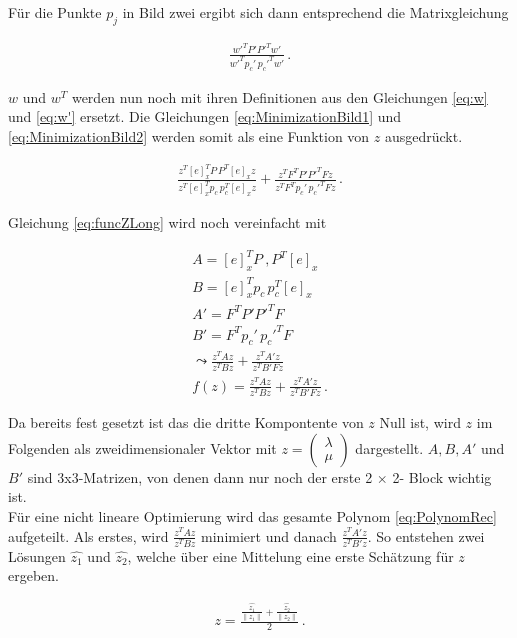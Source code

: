 Für die Punkte $p_j$ in Bild zwei ergibt sich dann entsprechend die Matrixgleichung

\begin{gather}
	\frac{w'^TP'P'^Tw'}{w'^Tp_c' \, p_c'^Tw'}\label{eq:MinimizationBild2}\, .
\end{gather} 


$w$ und $w^T$ werden nun noch mit ihren Definitionen aus den Gleichungen \ref{eq:w} und \ref{eq:w'} ersetzt. Die Gleichungen \ref{eq:MinimizationBild1} und \ref{eq:MinimizationBild2} werden somit als eine Funktion von $z$ ausgedrückt\cite{ZZ}. 

\begin{gather}
	\frac{z^T[e]_x^TP \, P^T[e]_xz}{z^T[e]_x^Tp_c \, p_c^T[e]_xz}+\frac{z^TF^TP'P'^TFz}{z^TF^Tp_c' \, p_c'^TFz} \, . \label{eq:funcZLong}
\end{gather}

Gleichung \ref{eq:funcZLong} wird noch vereinfacht mit

\begin{gather}
	A = [e]_x^TP \ ,P^T[e]_x\\
	B=[e]_x^Tp_c \, p_c^T[e]_x\\
	A'=F^TP'P'^TF\\
	B'= F^Tp_c' \, p_c'^TF\\
	\leadsto 
	\frac{z^TAz}{z^TBz}+\frac{z^TA'z}{z^TB'Fz}\\
	f(z) = \frac{z^TAz}{z^TBz}+\frac{z^TA'z}{z^TB'Fz}\, .\label{eq:PolynomRec}
\end{gather}


Da bereits fest gesetzt ist das die dritte Kompontente von $z$ Null ist, wird $z$ im Folgenden als zweidimensionaler Vektor mit $z = \begin{pmatrix}
\lambda\\ \mu\end{pmatrix}$ dargestellt. $A,B,A'$ und $B'$ sind 3x3-Matrizen, von denen dann nur noch der erste 2 $\times$ 2- Block wichtig ist.\\

Für eine nicht lineare Optimierung wird das gesamte Polynom \ref{eq:PolynomRec} aufgeteilt. Als erstes, wird $\frac{z^TAz}{z^TBz}$ minimiert und danach $\frac{z^TA'z}{z^TB'z}$. So entstehen zwei Lösungen $\hat{z_1}$ und $\hat{z_2}$, welche über eine Mittelung eine erste Schätzung für $z$ ergeben\cite{ZZ}.

\begin{gather}
	z = \frac{\frac{\hat{z_1}}{\| z_1 \|}+\frac{\hat{z_2}}{\| z_2 \|}}{2} \, .
\end{gather}\\

